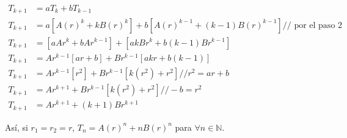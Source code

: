 \begin{align*}
	T_{k+1}&= aT_{k}+bT_{k-1}\\
	T_{k+1}&= a[A(r)^k+kB(r)^k]+b[A(r)^{k-1}+(k-1)B(r)^{k-1}] // \text{ por el paso 2}\\
	T_{k+1}&=[aAr^k+bAr^{k-1}]+[akBr^k+b(k-1)Br^{k-1}]\\
	T_{k+1}&=Ar^{k-1}[ar+b]+Br^{k-1}[akr + b(k-1)]\\
	T_{k+1}&=Ar^{k-1}[r^2]+Br^{k-1}[k(r^{2}) +r^{2}]//r^2 = ar + b\\
	T_{k+1}&=Ar^{k+1}+Br^{k-1}[k(r^2) + r^2]//-b = r^{2}\\
	T_{k+1}&=Ar^{k+1}+(k+1)Br^{k+1}
\end{align*}

Así, si $r_{1}=r_{2}=r$, $T_{n}=A(r)^{n}+nB(r)^{n}$ para $\forall n\in\mathds{N}$.